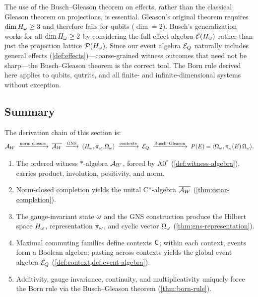 \begin{remark}
\label{rem:no-dim-restriction}
The use of the Busch--Gleason theorem on effects, rather than the
classical Gleason theorem on projections, is essential.  Gleason's
original theorem \citep{gleason1957} requires $\dim H_\omega \geq 3$
and therefore fails for qubits ($\dim = 2$).  Busch's generalization
\citep{busch2003} works for all $\dim H_\omega \geq 2$ by considering
the full effect algebra $\mathcal{E}(H_\omega)$ rather than just the
projection lattice $\mathcal{P}(H_\omega)$.  Since our event algebra
$\mathcal{E}_Q$ naturally includes general effects
(\cref{def:effects})---coarse-grained witness outcomes that need not
be sharp---the Busch--Gleason theorem is the correct tool.  The Born
rule derived here applies to qubits, qutrits, and all finite- and
infinite-dimensional systems without exception.
\end{remark}

\subsection{Summary}
\label{sec:context-born:summary}

The derivation chain of this section is:
\[
  \mathcal{A}_W
  \;\xrightarrow{\text{norm closure}}\;
  \overline{\mathcal{A}_W}
  \;\xrightarrow{\mathrm{GNS}}\;
  (H_\omega, \pi_\omega, \Omega_\omega)
  \;\xrightarrow{\text{contexts}}\;
  \mathcal{E}_Q
  \;\xrightarrow{\text{Busch--Gleason}}\;
  P(E) = \langle \Omega_\omega, \pi_\omega(E)\, \Omega_\omega \rangle.
\]

\begin{enumerate}[nosep]
  \item The ordered witness $*$-algebra $\mathcal{A}_W$, forced by A0$^*$
        (\cref{def:witness-algebra}), carries product, involution,
        positivity, and norm.
  \item Norm-closed completion yields the unital C*-algebra $\overline{\mathcal{A}_W}$
        (\cref{thm:cstar-completion}).
  \item The gauge-invariant state $\omega$ and the GNS construction
        produce the Hilbert space $H_\omega$, representation $\pi_\omega$, and
        cyclic vector $\Omega_\omega$ (\cref{thm:gns-representation}).
  \item Maximal commuting families define contexts $\mathsf{C}$; within each
        context, events form a Boolean algebra; pasting across contexts
        yields the global event algebra $\mathcal{E}_Q$
        (\cref{def:context,def:event-algebra}).
  \item Additivity, gauge invariance, continuity, and multiplicativity
        uniquely force the Born rule via the Busch--Gleason theorem
        (\cref{thm:born-rule}).
\end{enumerate}

